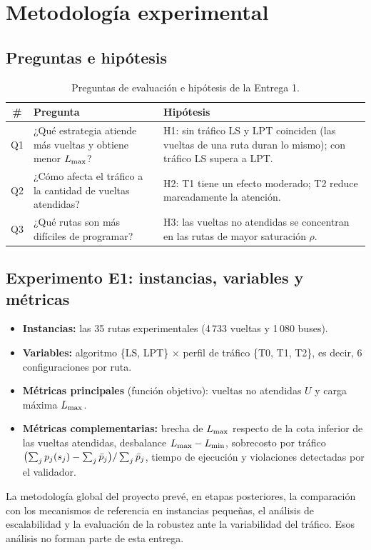 \section{Metodología experimental}\label{sec:metodologia}

\subsection{Preguntas e hipótesis}
\begin{table}[H]
\centering\small
\caption{Preguntas de evaluación e hipótesis de la Entrega 1.}
\begin{tabularx}{\textwidth}{cL{6.0cm}Y}
\toprule
\# & Pregunta & Hipótesis \\
\midrule
Q1 & ¿Qué estrategia atiende más vueltas y obtiene menor $L_{\max}$? & H1: sin tráfico LS y LPT coinciden (las vueltas de una ruta duran lo mismo); con tráfico LS supera a LPT. \\
Q2 & ¿Cómo afecta el tráfico a la cantidad de vueltas atendidas? & H2: T1 tiene un efecto moderado; T2 reduce marcadamente la atención. \\
Q3 & ¿Qué rutas son más difíciles de programar? & H3: las vueltas no atendidas se concentran en las rutas de mayor saturación $\rho$. \\
\bottomrule
\end{tabularx}
\end{table}

\subsection{Experimento E1: instancias, variables y métricas}
\begin{itemize}
  \item \textbf{Instancias:} las 35 rutas experimentales (4\,733 vueltas y 1\,080 buses).
  \item \textbf{Variables:} algoritmo \{LS, LPT\} $\times$ perfil de tráfico \{T0, T1, T2\}, es decir, 6 configuraciones por ruta.
  \item \textbf{Métricas principales} (función objetivo): vueltas no atendidas $U$ y carga máxima $L_{\max}$.
  \item \textbf{Métricas complementarias:} brecha de $L_{\max}$ respecto de la cota inferior de las vueltas atendidas, desbalance $L_{\max} - L_{\min}$, sobrecosto por tráfico $\bigl(\sum_j p_j(s_j) - \sum_j \bar{p}_j\bigr) / \sum_j \bar{p}_j$, tiempo de ejecución y violaciones detectadas por el validador.
\end{itemize}
La metodología global del proyecto prevé, en etapas posteriores, la comparación con los mecanismos de referencia en instancias pequeñas, el análisis de escalabilidad y la evaluación de la robustez ante la variabilidad del tráfico. Esos análisis no forman parte de esta entrega.

